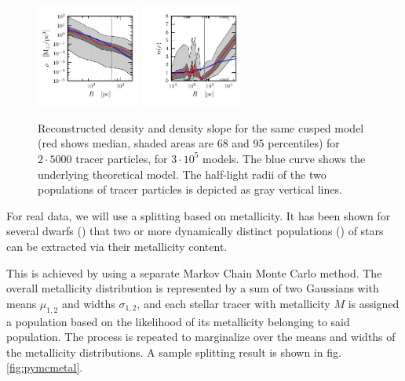 \begin{figure}
    \begin{center}
        \hspace{-7mm}
        \includegraphics[width=0.3\textwidth]{fig/prof_2_pop_cusp/prof_rho_0.pdf}
        \includegraphics[width=0.3\textwidth]{fig/prof_2_pop_cusp/prof_nr_0.pdf}
        \caption{Reconstructed density and density slope for the same
          cusped model (red shows median, shaded areas are 68 and 95
          percentiles) for $2\cdot 5000$ tracer particles, for
          $3\cdot10^5$ models. The blue curve shows the underlying
          theoretical model. The half-light radii of the two
          populations of tracer particles is depicted as gray vertical
          lines.}
        \label{fig:cusp2pop}
    \end{center}
\end{figure}

For real data, we will use a splitting based on metallicity. It has
been shown for several dwarfs () that two or more
dynamically distinct populations () of stars can be
extracted via their metallicity content.

This is achieved by using a separate Markov Chain Monte Carlo
method. The overall metallicity distribution is represented by a sum
of two Gaussians with means $\mu_{1,2}$ and widths $\sigma_{1,2}$, and
each stellar tracer with metallicity $M$ is assigned a population
based on the likelihood of its metallicity belonging to said
population. The process is repeated to marginalize over the means and
widths of the metallicity distributions. A sample splitting result is
shown in fig. \ref{fig:pymcmetal}.

